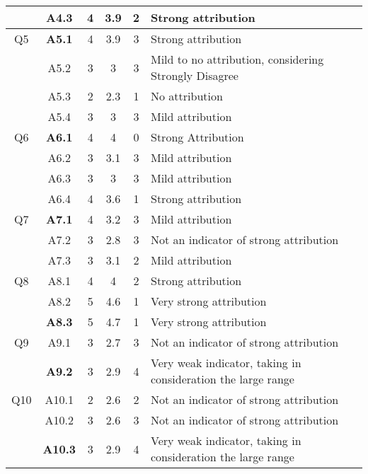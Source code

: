 \begin{longtable}{  c | c  | c | c | c |  p{} }
        & A4.3
                      & 4  & 3.9  &  2 & Strong attribution  \\
        \hline
        Q5 
        & \textbf{A5.1}
                    & 4 & 3.9  & 3 & Strong attribution  \\
        & A5.2
                       & 3 & 3 & 3 & Mild to no attribution, considering Strongly Disagree  \\
        & A5.3
                      & 2 & 2.3  & 1 & No attribution  \\
        & A5.4
        				& 3 & 3 & 3 & Mild attribution \\
        \hline
        Q6
        & \textbf{A6.1}
                    & 4  & 4  &  0 & Strong Attribution   \\
        & A6.2
                       & 3 & 3.1 & 3 & Mild attribution  \\
        & A6.3
                      & 3 & 3  & 3 & Mild attribution  \\
        & A6.4
        				& 4 & 3.6 & 1 & Strong attribution \\
        \hline
        Q7
        & \textbf{A7.1}
                    & 4 & 3.2  & 3 & Mild attribution \\
        & A7.2
                       & 3  & 2.8  & 3 & Not an indicator of strong attribution  \\
        & A7.3
                      & 3 &  3.1 & 2 & Mild attribution  \\
       \hline
        Q8
        & A8.1
                    & 4 & 4  & 2 & Strong attribution   \\
        & A8.2
                       & 5 & 4.6 & 1 & Very strong attribution  \\
        & \textbf{A8.3}
                      & 5 & 4.7 & 1 & Very strong attribution \\
        \hline
        Q9
        & A9.1
                    & 3 & 2.7  & 3 & Not an indicator of strong attribution  \\
        & \textbf{A9.2}
                       & 3 & 2.9  & 4 & Very weak indicator, taking in consideration the large range \\
        \hline
        Q10
        & A10.1
                    & 2 & 2.6  & 2 &  Not an indicator of strong attribution   \\
        & A10.2
                       & 3  & 2.6 & 3 & Not an indicator of strong attribution  \\
        & \textbf{A10.3}
                      & 3 & 2.9  & 4 & Very weak indicator, taking in consideration the large range \\

\end{longtable}
